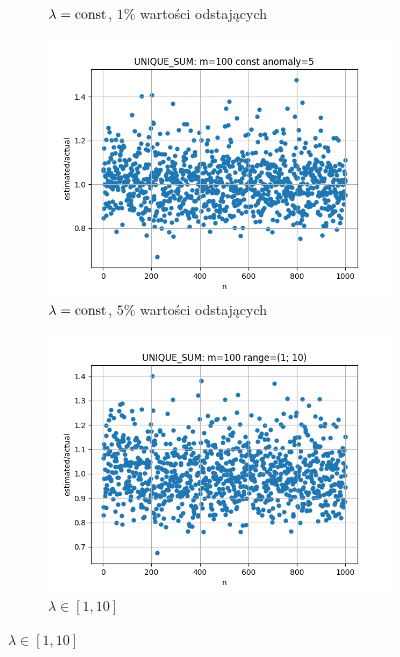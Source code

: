 \documentclass{article}
\begin{document}
\begin{figure}[H]
\begin{subfigure}{0.6\textwidth}
            \caption{$\lambda = \textnormal{const}$, $1\%$ wartości odstających}
        \end{subfigure}
        \begin{subfigure}{0.6\textwidth}
            \centering
            \includegraphics[width=\linewidth]{sum/zad1_const_5.png}
            \caption{$\lambda = \textnormal{const}$, $5\%$ wartości odstających}
        \end{subfigure}
        \begin{subfigure}{0.6\textwidth}
            \centering
            \includegraphics[width=\linewidth]{sum/zad1_range_1_10.png}
            \caption{$\lambda \in [1, 10]$}
        \end{subfigure}

\end{figure}
\end{document}
